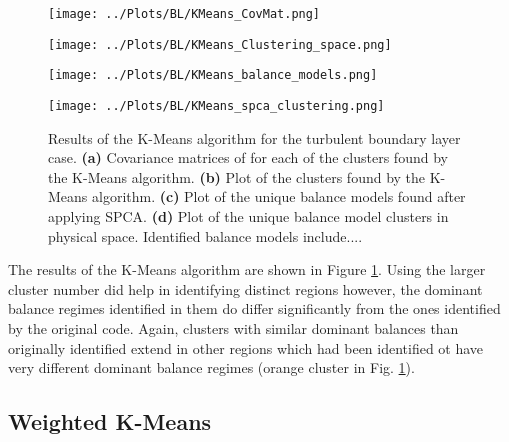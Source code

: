 \documentclass[12pt]{report} %
\begin{document}
\begin{figure}[htbp]
  \centering

  \begin{minipage}{0.7\textwidth}
    \centering
    \texttt{[image: ../Plots/BL/KMeans\_CovMat.png]}
    \subcaption{}
  \end{minipage}

  \begin{minipage}{\textwidth}
      \begin{minipage}[b]{0.6\textwidth}
          \centering
          \texttt{[image: ../Plots/BL/KMeans\_Clustering\_space.png]}
          \subcaption{}
      \end{minipage}
      \begin{minipage}[b]{0.35\textwidth}
          \centering
          \texttt{[image: ../Plots/BL/KMeans\_balance\_models.png]}
          \subcaption{}
      \end{minipage}
  \end{minipage}

  \begin{minipage}{0.7\textwidth}
      \centering
      \texttt{[image: ../Plots/BL/KMeans\_spca\_clustering.png]}
      \subcaption{}
  \end{minipage}
  \caption{Results of the K-Means algorithm for the turbulent boundary layer case. \textbf{(a)} Covariance matrices of for each of the clusters found by the K-Means algorithm. \textbf{(b)} Plot of the clusters found by the K-Means algorithm. \textbf{(c)} Plot of the unique balance models found after applying SPCA. \textbf{(d)} Plot of the unique balance model clusters in physical space. Identified balance models include....}

  \label{fig:KMeans_results}
\end{figure}

The results of the K-Means algorithm are shown in Figure \ref{fig:KMeans_results}. Using the larger cluster number did help in identifying distinct regions however, the dominant balance regimes identified in them do differ significantly from the ones identified by the original code. Again, clusters with similar dominant balances than originally identified extend in other regions which had been identified ot have very different dominant balance regimes (orange cluster in Fig. \ref{fig:KMeans_results}).

\subsection{Weighted K-Means}
\end{document}
